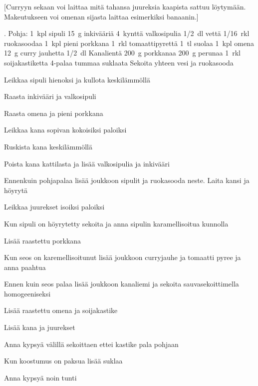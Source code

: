 [Curryyn sekaan voi laittaa mitä tahansa juureksia kaapista sattuu löytymään. Makeutukseen voi omenan sijasta laittaa esimerkiksi banaanin.]


\begin{step}
  . Pohja:
  1~kpl sipuli
  15~g inkivääriä
  4~kynttä valkosipulia
  1/2~dl vettä
  1/16~rkl ruokasoodaa
  1~kpl pieni porkkana
  1~rkl tomaattipyrettä
  1~tl suolaa
  1~kpl omena
  12~g curry jauhetta
  1/2~dl Kanalientä
  200~g porkkanaa
  200~g perunaa
  1~rkl soijakastiketta
  4-palaa tummaa suklaata
  \method
  Sekoita yhteen vesi ja ruokasooda

  Leikkaa sipuli hienoksi ja kullota keskilämmöllä

  Raasta inkivääri ja valkosipuli

  Raasta omena ja pieni porkkana

  Leikkaa kana sopivan kokoisiksi paloiksi

  Ruskista kana keskilämmöllä

  Poista kana kattilasta ja lisää valkosipulia ja inkivääri

  Ennenkuin pohjapalaa lisää joukkoon sipulit ja ruokasooda neste. Laita kansi ja höyrytä

  Leikkaa juurekset isoiksi paloiksi

  Kun sipuli on höyrytetty sekoita ja anna sipulin karamellisoitua kunnolla

  Lisää raastettu porkkana

  Kun seos on karemellisoitunut lisää joukkoon curryjauhe ja tomaatti pyree ja anna paahtua

  Ennen kuin seos palaa lisää joukkoon kanaliemi ja sekoita sauvasekoittimella homogeeniseksi

  Lisää raastettu omena ja soijakastike

  Lisää kana ja juurekset

  Anna kypsyä välillä sekoittaen ettei kastike pala pohjaan

  Kun koostumus on paksua lisää suklaa

  Anna kypsyä noin tunti

\end{step}
